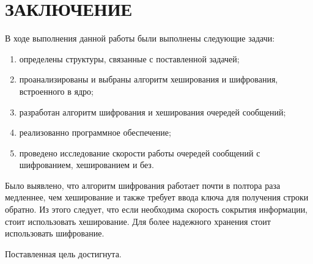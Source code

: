 \section*{\large ЗАКЛЮЧЕНИЕ}

В ходе выполнения данной работы были выполнены следующие задачи:
\begin{enumerate}
    \item определены структуры, связанные с поставленной задачей;
    \item проанализированы и выбраны алгоритм хеширования и шифрования, встроенного в ядро;
    \item разработан алгоритм шифрования и хеширования очередей сообщений;
    \item реализованно программное обеспечение;
    \item проведено исследование скорости работы очередей сообщений с шифрованием, хешированием и без.
\end{enumerate}

Было выявлено, что алгоритм шифрования работает почти в полтора раза медленнее, чем хеширование и также требует ввода ключа для получения строки обратно.
Из этого следует, что если необходима скорость сокрытия информации, стоит использовать хеширование.
Для более надежного хранения стоит использовать шифрование.

Поставленная цель достигнута.